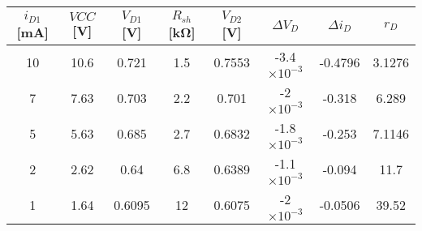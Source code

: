 

{}

\begin{table}[!ht]
    \centering
    \begin{tabular}{|c|c|c|c|c|c|c|c|}
    \hline
    \hline
        $i_{D1}$ [mA]  & $VCC$ [V] & $V_{D1}$ [V] & $R_{sh}$ [kΩ] & $V_{D2}$ [V] & $\Delta V_{D}$ & $\Delta i_{D}$ & $r_{D}$\\ \hline\hline
        10 & 10.6 & 0.721 & 1.5 & 0.7553 & -3.4$\times 10^{-3}$ & -0.4796 & 3.1276\\ 
        \hline
        7 & 7.63 & 0.703 & 2.2 & 0.701 & -2$\times 10^{-3}$ & -0.318 & 6.289\\ \hline
        5 & 5.63 & 0.685 & 2.7 & 0.6832 & -1.8$\times 10^{-3}$ & -0.253 & 7.1146\\ \hline
        2 & 2.62 & 0.64 & 6.8 & 0.6389 & -1.1$\times 10^{-3}$ & -0.094 & 11.7 \\ \hline
        1 & 1.64 & 0.6095 & 12 & 0.6075 & -2$\times 10^{-3}$ & -0.0506 & 39.52 \\ \hline\hline
    \end{tabular}
\end{table}






